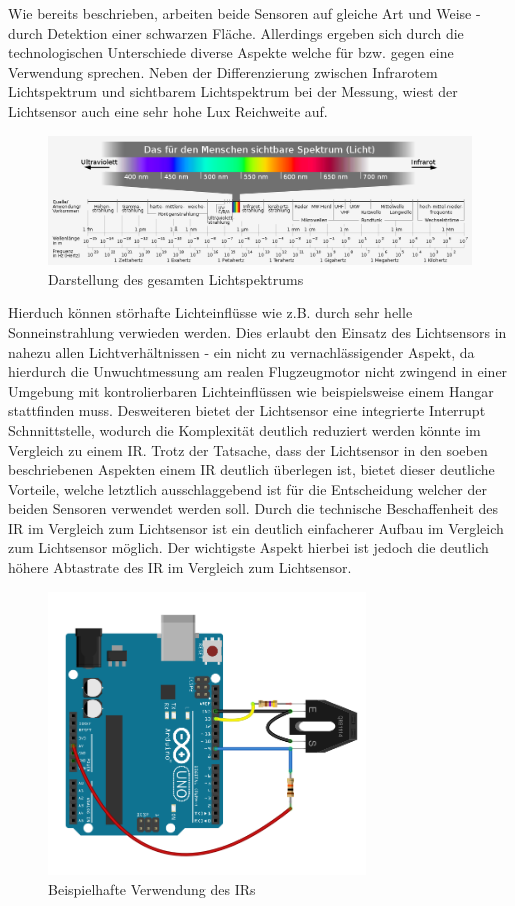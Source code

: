 Wie bereits beschrieben, arbeiten beide Sensoren auf gleiche Art und Weise - durch Detektion einer schwarzen Fläche. 
Allerdings ergeben sich durch die technologischen Unterschiede diverse Aspekte welche für bzw. gegen eine Verwendung sprechen.
Neben der Differenzierung zwischen Infrarotem Lichtspektrum und sichtbarem Lichtspektrum bei der Messung, wiest der Lichtsensor auch eine sehr hohe Lux Reichweite auf. 
\begin{figure}[H]
	\centering
	\includegraphics[width=\textwidth]{images/chapter/03/lichtspektrum.png}
	\caption{Darstellung des gesamten Lichtspektrums}
\end{figure}
Hierduch können störhafte Lichteinflüsse wie z.B. durch sehr helle Sonneinstrahlung verwieden werden.
Dies erlaubt den Einsatz des Lichtsensors in nahezu allen Lichtverhältnissen - ein nicht zu vernachlässigender Aspekt, da hierdurch die Unwuchtmessung am realen Flugzeugmotor nicht zwingend in einer Umgebung mit kontrolierbaren Lichteinflüssen wie beispielsweise einem Hangar stattfinden muss.
Desweiteren bietet der Lichtsensor eine integrierte Interrupt Schnnittstelle, wodurch die Komplexität deutlich reduziert werden könnte im Vergleich zu einem \ac{IR}.
Trotz der Tatsache, dass der Lichtsensor in den soeben beschriebenen Aspekten einem \ac{IR} deutlich überlegen ist, bietet dieser deutliche Vorteile, welche letztlich ausschlaggebend ist für die Entscheidung welcher der beiden Sensoren verwendet werden soll.
Durch die technische Beschaffenheit des \ac{IR} im Vergleich zum Lichtsensor ist ein deutlich einfacherer Aufbau im Vergleich zum Lichtsensor möglich.
Der wichtigste Aspekt hierbei ist jedoch die deutlich höhere Abtastrate des \ac{IR} im Vergleich zum Lichtsensor. 
\begin{figure}[H]
	\centering
	\includegraphics[width=0.75\textwidth]{images/chapter/03/sensor_ir_schaltung.png}
	\caption{Beispielhafte Verwendung des \ac{IR}s}
	\label{fig:ir_example}
\end{figure}
